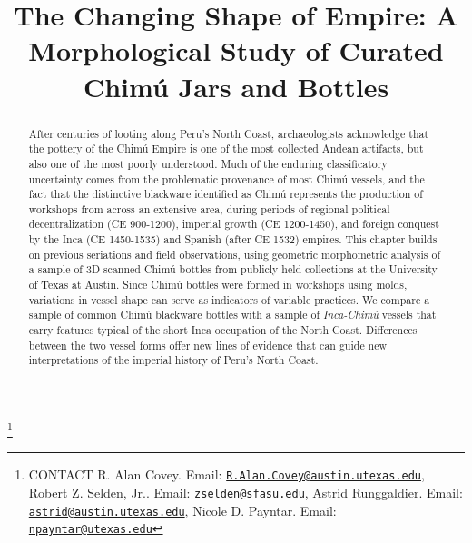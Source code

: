 \documentclass[]{interact}
\theoremstyle{plain}%
\theoremstyle{definition}
\theoremstyle{remark}
\begin{document}

\title{The Changing Shape of Empire: A Morphological Study of Curated
Chimú Jars and Bottles}


\author{
}

\thanks{CONTACT R. Alan
Covey. Email: \href{mailto:R.Alan.Covey@austin.utexas.edu}{\nolinkurl{R.Alan.Covey@austin.utexas.edu}}, Robert
Z. Selden,
Jr.. Email: \href{mailto:zselden@sfasu.edu}{\nolinkurl{zselden@sfasu.edu}}, Astrid
Runggaldier. Email: \href{mailto:astrid@austin.utexas.edu}{\nolinkurl{astrid@austin.utexas.edu}}, Nicole
D.
Payntar. Email: \href{mailto:npayntar@utexas.edu}{\nolinkurl{npayntar@utexas.edu}}}

\maketitle

\begin{abstract}
After centuries of looting along Peru's North Coast, archaeologists
acknowledge that the pottery of the Chimú Empire is one of the most
collected Andean artifacts, but also one of the most poorly understood.
Much of the enduring classificatory uncertainty comes from the
problematic provenance of most Chimú vessels, and the fact that the
distinctive blackware identified as Chimú represents the production of
workshops from across an extensive area, during periods of regional
political decentralization (CE 900-1200), imperial growth (CE
1200-1450), and foreign conquest by the Inca (CE 1450-1535) and Spanish
(after CE 1532) empires. This chapter builds on previous seriations and
field observations, using geometric morphometric analysis of a sample of
3D-scanned Chimú bottles from publicly held collections at the
University of Texas at Austin. Since Chimú bottles were formed in
workshops using molds, variations in vessel shape can serve as
indicators of variable practices. We compare a sample of common Chimú
blackware bottles with a sample of \emph{Inca-Chimú} vessels that carry
features typical of the short Inca occupation of the North Coast.
Differences between the two vessel forms offer new lines of evidence
that can guide new interpretations of the imperial history of Peru's
North Coast.
\end{abstract}
\end{document}

